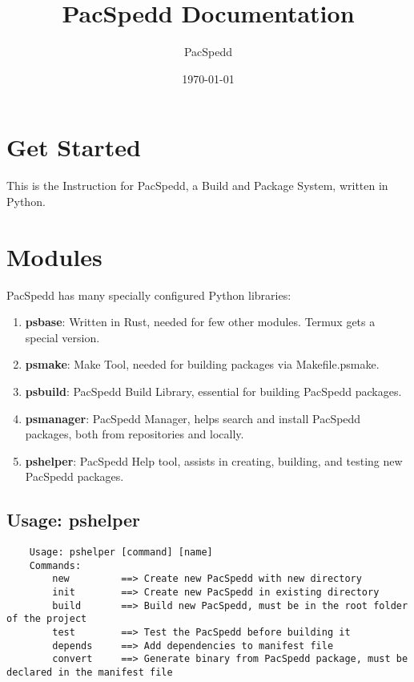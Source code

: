 \documentclass{article}
\title{PacSpedd Documentation}
\author{PacSpedd}
\date{\today}
\begin{document}
\maketitle

\tableofcontents

\section{Get Started}
This is the Instruction for PacSpedd, a Build and Package System, written in Python.

\section{Modules}
PacSpedd has many specially configured Python libraries:

\begin{enumerate}
    \item \textbf{psbase}: Written in Rust, needed for few other modules. Termux gets a special version.
    \item \textbf{psmake}: Make Tool, needed for building packages via Makefile.psmake.
    \item \textbf{psbuild}: PacSpedd Build Library, essential for building PacSpedd packages.
    \item \textbf{psmanager}: PacSpedd Manager, helps search and install PacSpedd packages, both from repositories and locally.
    \item \textbf{pshelper}: PacSpedd Help tool, assists in creating, building, and testing new PacSpedd packages.
\end{enumerate}

\subsection{Usage: pshelper}

\begin{verbatim}
    Usage: pshelper [command] [name]
    Commands:
        new         ==> Create new PacSpedd with new directory
        init        ==> Create new PacSpedd in existing directory
        build       ==> Build new PacSpedd, must be in the root folder of the project
        test        ==> Test the PacSpedd before building it
        depends     ==> Add dependencies to manifest file
        convert     ==> Generate binary from PacSpedd package, must be declared in the manifest file
\end{verbatim}
\end{document}
